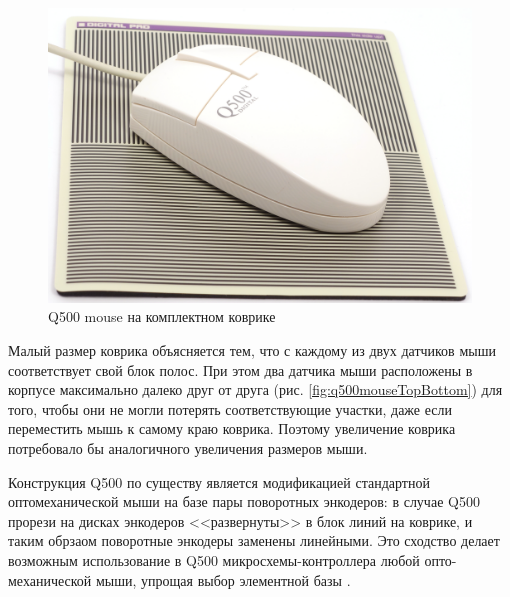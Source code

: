 \documentclass[11pt, a4paper]{article}
\begin{document}
\begin{figure}[h]
    \centering
    \includegraphics[scale=0.4]{1996_q500_mouse/pad_30.jpg}
    \caption{Q500 mouse на комплектном коврике}
    \label{fig:q500mousePad}
\end{figure}

Малый размер коврика объясняется тем, что с каждому из двух датчиков мыши соответствует свой блок полос.
При этом два датчика мыши расположены в корпусе максимально далеко друг от друга (рис. \ref{fig:q500mouseTopBottom}) для того, чтобы они не могли потерять соответствующие участки, даже если переместить мышь к самому краю коврика. Поэтому увеличение коврика потребовало бы аналогичного увеличения размеров мыши.

Конструкция Q500 по существу является модификацией стандартной оптомеханической мыши на базе пары поворотных энкодеров: в случае Q500 прорези на дисках энкодеров <<развернуты>> в блок линий на коврике, и таким обрзаом поворотные энкодеры заменены линейными. Это сходство делает возможным использование в Q500 микросхемы-контроллера любой опто-механической мыши, упрощая выбор элементной базы \cite{yq}.
\end{document}
